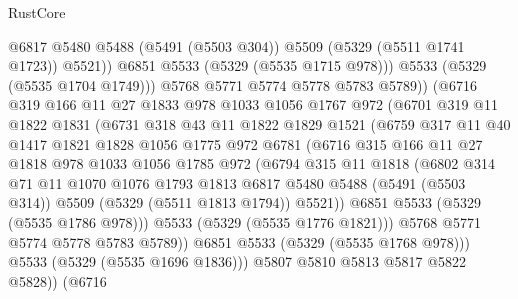 \begin{lexlean}{RustCore}
\begin{coremodule}
                      @6817
                      @5480
                      @5488
                      (@5491 (@5503 @304))
                      @5509
                      (@5329 (@5511 @1741 @1723))
                      @5521))
                  @6851
                  @5533
                  (@5329 (@5535 @1715 @978)))
                @5533
                (@5329 (@5535 @1704 @1749)))
              @5768
              @5771
              @5774
              @5778
              @5783
              @5789))
          (@6716
            @319
            @166
            @11
            @27
            @1833
            @978
            @1033
            @1056
            @1767
            @972
            (@6701
              @319
              @11
              @1822
              @1831
              (@6731
                @318
                @43
                @11
                @1822
                @1829
                @1521
                (@6759
                  @317
                  @11
                  @40
                  @1417
                  @1821
                  @1828
                  @1056
                  @1775
                  @972
                  @6781
                  (@6716
                    @315
                    @166
                    @11
                    @27
                    @1818
                    @978
                    @1033
                    @1056
                    @1785
                    @972
                    (@6794
                      @315
                      @11
                      @1818
                      (@6802
                        @314
                        @71
                        @11
                        @1070
                        @1076
                        @1793
                        @1813
                        @6817
                        @5480
                        @5488
                        (@5491 (@5503 @314))
                        @5509
                        (@5329 (@5511 @1813 @1794))
                        @5521))
                    @6851
                    @5533
                    (@5329 (@5535 @1786 @978)))
                  @5533
                  (@5329 (@5535 @1776 @1821)))
                @5768
                @5771
                @5774
                @5778
                @5783
                @5789))
            @6851
            @5533
            (@5329 (@5535 @1768 @978)))
          @5533
          (@5329 (@5535 @1696 @1836)))
        @5807
        @5810
        @5813
        @5817
        @5822
        @5828))
    (@6716

\end{coremodule}
\end{lexlean}
